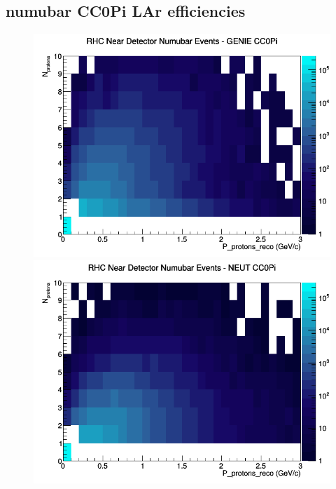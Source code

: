 \subsection{numubar CC0Pi LAr efficiencies}
\begin{figure}[h]
\includegraphics[width=\linewidth]{eff_N_P/LAr/protons/CC0Pi_RHC_ND_numubar_N_P_GENIE.png}
\endminipage
{}
\includegraphics[width=\linewidth]{eff_N_P/LAr/protons/CC0Pi_RHC_ND_numubar_N_P_NEUT.png}
\endminipage
{}

\end{figure}
